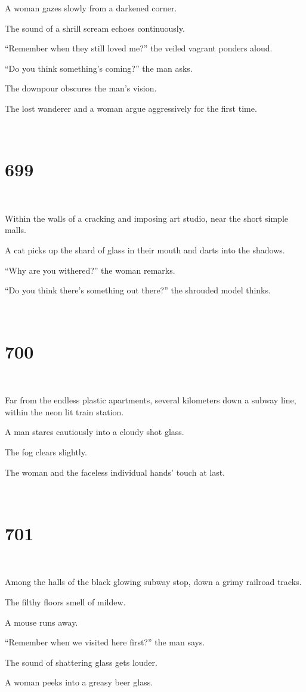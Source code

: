 \documentclass{report}
\begin{document}
A woman gazes slowly from a darkened corner.

The sound of a shrill scream echoes continuously.

``Remember when they still loved me?'' the veiled vagrant ponders aloud.

``Do you think something's coming?'' the man asks.

The downpour obscures the man's vision.

The lost wanderer and a woman argue aggressively for the first time.

~
\chapter*{699}
~

Within the walls of a cracking and imposing art studio, near the short simple malls.

A cat picks up the shard of glass in their mouth and darts into the shadows.

``Why are you withered?'' the woman remarks.

``Do you think there's something out there?'' the shrouded model thinks.

~
\chapter*{700}
~

Far from the endless plastic apartments, several kilometers down a subway line, within the neon lit train station.

A man stares cautiously into a cloudy shot glass.

The fog clears slightly.

The woman and the faceless individual hands' touch at last.

~
\chapter*{701}
~

Among the halls of the black glowing subway stop, down a grimy railroad tracks.

The filthy floors smell of mildew.

A mouse runs away.

``Remember when we visited here first?'' the man says.

The sound of shattering glass gets louder.

A woman peeks into a greasy beer glass.
\end{document}
